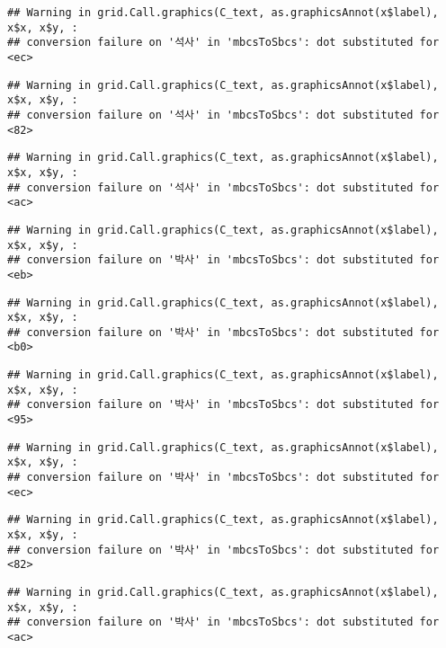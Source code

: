 \documentclass[
]{article}
\begin{document}
\begin{verbatim}
## Warning in grid.Call.graphics(C_text, as.graphicsAnnot(x$label), x$x, x$y, :
## conversion failure on '석사' in 'mbcsToSbcs': dot substituted for <ec>
\end{verbatim}

\begin{verbatim}
## Warning in grid.Call.graphics(C_text, as.graphicsAnnot(x$label), x$x, x$y, :
## conversion failure on '석사' in 'mbcsToSbcs': dot substituted for <82>
\end{verbatim}

\begin{verbatim}
## Warning in grid.Call.graphics(C_text, as.graphicsAnnot(x$label), x$x, x$y, :
## conversion failure on '석사' in 'mbcsToSbcs': dot substituted for <ac>
\end{verbatim}

\begin{verbatim}
## Warning in grid.Call.graphics(C_text, as.graphicsAnnot(x$label), x$x, x$y, :
## conversion failure on '박사' in 'mbcsToSbcs': dot substituted for <eb>
\end{verbatim}

\begin{verbatim}
## Warning in grid.Call.graphics(C_text, as.graphicsAnnot(x$label), x$x, x$y, :
## conversion failure on '박사' in 'mbcsToSbcs': dot substituted for <b0>
\end{verbatim}

\begin{verbatim}
## Warning in grid.Call.graphics(C_text, as.graphicsAnnot(x$label), x$x, x$y, :
## conversion failure on '박사' in 'mbcsToSbcs': dot substituted for <95>
\end{verbatim}

\begin{verbatim}
## Warning in grid.Call.graphics(C_text, as.graphicsAnnot(x$label), x$x, x$y, :
## conversion failure on '박사' in 'mbcsToSbcs': dot substituted for <ec>
\end{verbatim}

\begin{verbatim}
## Warning in grid.Call.graphics(C_text, as.graphicsAnnot(x$label), x$x, x$y, :
## conversion failure on '박사' in 'mbcsToSbcs': dot substituted for <82>
\end{verbatim}

\begin{verbatim}
## Warning in grid.Call.graphics(C_text, as.graphicsAnnot(x$label), x$x, x$y, :
## conversion failure on '박사' in 'mbcsToSbcs': dot substituted for <ac>
\end{verbatim}
\end{document}
